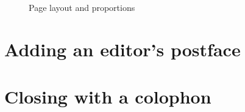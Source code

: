 \documentclass[16pt,letter,oneside,usenames,dvipsnames]{memoir}
\begin{document}
\begin{figure}
\centering

\caption{Page layout and proportions\label{fig:golden-ratio}}
\end{figure}

\clearpage{}
\chapter{Adding an editor's postface}

\chapter{Closing with a colophon}

\end{document}
